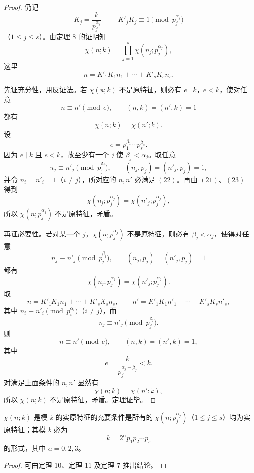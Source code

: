 \begin{proof}
	仍记
	\[
		K_j=\frac{k}{p_j^{\alpha_j}},\qquad
		K'_jK_j\equiv1\pmod {p_j^{\alpha_j}}
	\]
	（$1\leq j\leq s$）。由定理 8 的证明知
	\begin{equation}
		\chi(n;k)=\prod_{j=1}^{s}\chi(n_j;p_j^{\alpha_j}),
	\tag{21}
	\end{equation}
	这里
	\[
		n=K'_1K_1n_1+\cdots+K'_sK_sn_s.
	\]

	先证充分性，用反证法。若 $\chi(n;k)$ 不是原特征，则必有 $e\mid k$，$e<k$，使对任意
	\begin{equation}
		n\equiv n'\pmod e,\qquad (n,k)=(n',k)=1
		\tag{22}
	\end{equation}
	都有
	\begin{equation}
		\chi(n;k)=\chi(n';k).
		\tag{23}
	\end{equation}
	设
	\[
		e=p_1^{\beta_1}\cdots p_s^{\beta_s}.
	\]
	因为 $e\mid k$ 且 $e<k$，故至少有一个 $j$ 使 $\beta_j<\alpha_j$。取任意
	\[
		n_j\equiv n'_j\pmod {p_j^{\beta_j}},\qquad
		(n_j,p_j)=(n'_j,p_j)=1,
	\]
	并令 $n_i=n'_i=1$（$i\neq j$），所对应的 $n,n'$ 必满足 \((22)\)。再由 \((21)\)、\((23)\) 得到
	\[
		\chi(n_j;p_j^{\alpha_j})=\chi(n'_j;p_j^{\alpha_j}),
	\]
	所以 $\chi(n;p_j^{\alpha_j})$ 不是原特征，矛盾。

	再证必要性。若对某一个 $j$，$\chi(n;p_j^{\alpha_j})$ 不是原特征，则必有 $\beta_j<\alpha_j$，使得对任意
	\[
		n_j\equiv n'_j\pmod {p_j^{\beta_j}},\qquad
		(n_j,p_j)=(n'_j,p_j)=1
	\]
	都有
	\[
		\chi(n_j;p_j^{\alpha_j})=\chi(n'_j;p_j^{\alpha_j}).
	\]
	取
	\[
		n=K'_1K_1n_1+\cdots+K'_sK_sn_s,\qquad
		n'=K'_1K_1n'_1+\cdots+K'_sK_sn'_s,
	\]
	其中 $n_i\equiv n'_i\pmod {p_i^{\alpha_i}}$（$i\neq j$），而
	\[
		n_j\equiv n'_j\pmod {p_j^{\beta_j}}.
	\]
	则
	\[
		n\equiv n'\pmod e,\qquad (n,k)=(n',k)=1,
	\]
	其中
	\[
		e=\frac{k}{p_j^{\alpha_j-\beta_j}}<k.
	\]
	对满足上面条件的 $n,n'$ 显然有
	\[
		\chi(n;k)=\chi(n';k),
	\]
	所以 $\chi(n;k)$ 不是原特征，矛盾。定理证毕。
\end{proof}

\begin{theorem}[原文 定理 12]
	$\chi(n;k)$ 是模 $k$ 的实原特征的充要条件是所有的 $\chi(n;p_j^{\alpha_j})$（$1\leq j\leq s$）均为实原特征；其模 $k$ 必为
	\[
		k=2^{\alpha}p_1p_2\cdots p_s
	\]
	的形式，其中 $\alpha=0,2,3$。
\end{theorem}

\begin{proof}
	可由定理 10、定理 11 及定理 7 推出结论。
\end{proof}

